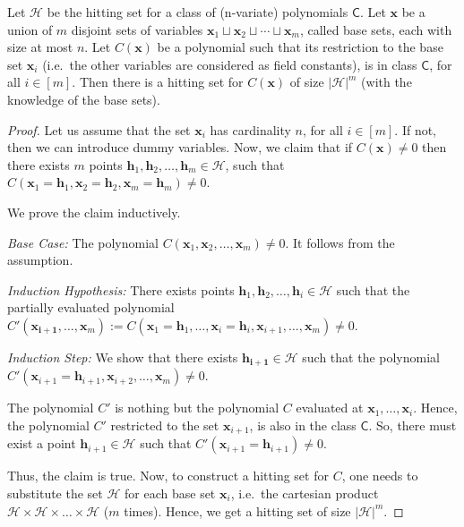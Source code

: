 \documentclass[final,oneeqnum, onethmnum, onefignum]{siamltex1213}
\newcommand{\abs}[1]{\lvert #1 \rvert}
\newcommand{\Hit}{\mathcal{H}} %
\begin{document}
\begin{lemma}
\label{lem:baseSets}
Let $\Hit$ be the hitting set for a class of (n-variate) polynomials $\mathsf{C}$.
Let $\mathbf{x}$ be a union of $m$ disjoint sets of variables 
$\mathbf{x}_1 \sqcup \mathbf{x}_2 \sqcup \dotsm \sqcup \mathbf{x}_m $, 
called base sets, each with size at most $n$.
Let $C(\mathbf{x})$ be a polynomial such that its restriction to the
base set $\mathbf{x}_i$ (i.e.\ the other variables are considered as field constants), 
is in class $\mathsf{C}$, for all $i \in [m]$.
Then there is a hitting set for $C(\mathbf{x})$ of size ${\abs{\Hit}}^m$ 
(with the knowledge of the base sets).
\end{lemma}
\begin{proof}
Let us assume that the set $\mathbf{x}_i$ has cardinality $n$, for all $i \in [m]$. 
If not, then we can introduce dummy variables. 
Now, we claim that if $C(\mathbf{x}) \neq 0$ then there exists $m$ points 
$\mathbf{h}_1, \mathbf{h}_2, \dots, \mathbf{h}_m \in \Hit$, such that 
$C(\mathbf{x}_1 =  \mathbf{h}_1, \mathbf{x}_2 =  \mathbf{h}_2, \mathbf{x}_m =  \mathbf{h}_m) \neq 0$.

We prove the claim inductively.

\emph{Base Case:} The polynomial $C(\mathbf{x}_1, \mathbf{x}_2, \dots, \mathbf{x}_m) \neq 0$.
It follows from the assumption.

\emph{Induction Hypothesis:} There exists points $\mathbf{h}_1, \mathbf{h}_2, \dots, \mathbf{h}_i \in \Hit$ 
such that the partially evaluated polynomial 
$C'(\mathbf{x_{i+1}}, \dots, \mathbf{x}_m) := 
C(\mathbf{x}_1 =  \mathbf{h}_1, \dots, \mathbf{x}_i =  \mathbf{h}_i, \mathbf{x}_{i+1}, \dots, \mathbf{x}_m) \neq 0$.

\emph{Induction Step:} We show that there exists $\mathbf{h_{i+1}} \in \Hit$ such that 
the polynomial $C'(\mathbf{x}_{i+1}=\mathbf{h}_{i+1}, \mathbf{x}_{i+2}, \dots, \mathbf{x}_m) \neq 0$.

The polynomial $C'$ is nothing but the polynomial 
$C$ evaluated at $\mathbf{x}_1, \dots, \mathbf{x}_i$.
Hence, the polynomial $C'$ restricted to 
the set $\mathbf{x}_{i+1}$, is also in the class $\mathsf{C}$.
So, there must exist a point $\mathbf{h}_{i+1} \in \Hit$ 
such that $C'(\mathbf{x}_{i+1} = \mathbf{h}_{i+1}) \neq 0$.

Thus, the claim is true.
Now, to construct a hitting set for $C$, one needs to substitute the set $\Hit$
for each base set $\mathbf{x}_i$, i.e.\ the cartesian product 
$\Hit \times \Hit \times \dots \times \Hit$ ($m$ times).
Hence, we get a hitting set of size ${\abs{\Hit}}^m$.

\end{proof}
\end{document}
